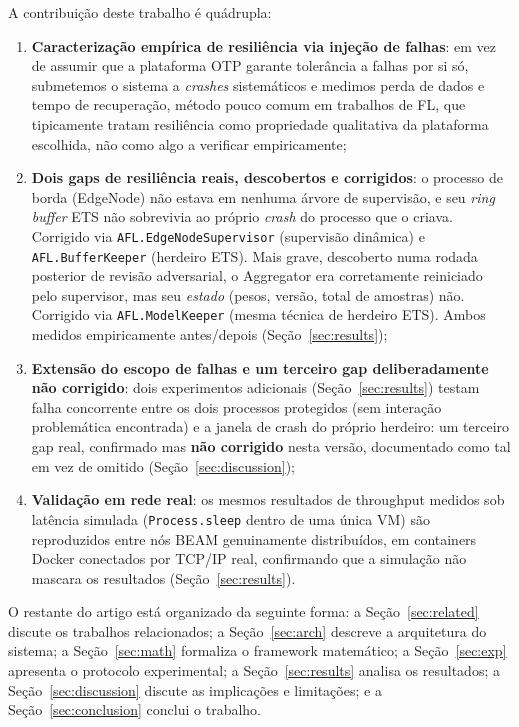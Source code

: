 \documentclass[conference,a4paper]{IEEEtran}
\begin{document}
A contribuição deste trabalho é quádrupla:
\begin{enumerate}[leftmargin=*,noitemsep]
  \item \textbf{Caracterização empírica de resiliência via injeção de falhas}:
        em vez de assumir que a plataforma OTP garante tolerância a falhas
        por si só, submetemos o sistema a \textit{crashes} sistemáticos e
        medimos perda de dados e tempo de recuperação, método pouco comum
        em trabalhos de FL, que tipicamente tratam resiliência como
        propriedade qualitativa da plataforma escolhida, não como algo a
        verificar empiricamente;
  \item \textbf{Dois gaps de resiliência reais, descobertos e corrigidos}: o
        processo de borda (EdgeNode) não estava em nenhuma árvore de
        supervisão, e seu \textit{ring buffer} ETS não sobrevivia ao
        próprio \textit{crash} do processo que o criava. Corrigido via
        \texttt{AFL.EdgeNodeSupervisor} (supervisão dinâmica) e
        \texttt{AFL.BufferKeeper} (herdeiro ETS). Mais grave, descoberto
        numa rodada posterior de revisão adversarial, o Aggregator era
        corretamente reiniciado pelo supervisor, mas seu \emph{estado}
        (pesos, versão, total de amostras) não. Corrigido via
        \texttt{AFL.ModelKeeper} (mesma técnica de herdeiro ETS). Ambos
        medidos empiricamente antes/depois (Seção~\ref{sec:results});
  \item \textbf{Extensão do escopo de falhas e um terceiro gap
        deliberadamente não corrigido}: dois experimentos adicionais
        (Seção~\ref{sec:results}) testam falha concorrente entre os dois
        processos protegidos (sem interação problemática encontrada) e a
        janela de crash do próprio herdeiro: um terceiro gap real,
        confirmado mas \textbf{não corrigido} nesta versão, documentado
        como tal em vez de omitido (Seção~\ref{sec:discussion});
  \item \textbf{Validação em rede real}: os mesmos resultados de
        throughput medidos sob latência simulada (\texttt{Process.sleep}
        dentro de uma única VM) são reproduzidos entre nós BEAM
        genuinamente distribuídos, em containers Docker conectados por
        TCP/IP real, confirmando que a simulação não mascara os
        resultados (Seção~\ref{sec:results}).
\end{enumerate}

O restante do artigo está organizado da seguinte forma: a
Seção~\ref{sec:related} discute os trabalhos relacionados; a
Seção~\ref{sec:arch} descreve a arquitetura do sistema; a
Seção~\ref{sec:math} formaliza o framework matemático; a
Seção~\ref{sec:exp} apresenta o protocolo experimental; a
Seção~\ref{sec:results} analisa os resultados; a
Seção~\ref{sec:discussion} discute as implicações e limitações; e a
Seção~\ref{sec:conclusion} conclui o trabalho.
\end{document}
